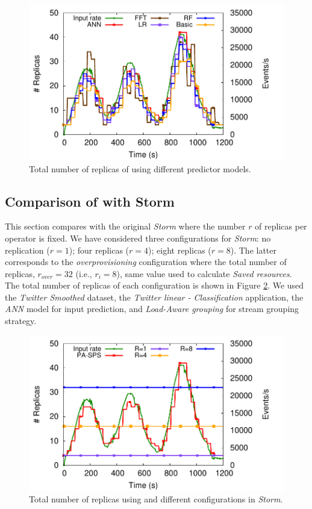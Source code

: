 \begin{figure}[!ht]
    \centering
    \includegraphics[width=0.75\linewidth]{figures/exp/predictive/TwitterLinear-Models-Replicas.pdf}
    \caption{Total number of replicas of \pSPS{} using different predictor models.}
    \label{fig:exp-pa-models-replicas}
\end{figure}


\subsection{Comparison of \pSPS{} with Storm}
\label{exp:pa-storm}
This section compares \pSPS{} with the original \textit{Storm} where the number $r$ of replicas per operator is fixed. We have considered three configurations for \textit{Storm}: no replication ($r=1$); four replicas ($r=4$); eight replicas ($r=8$). The latter corresponds to the \textit{overprovisioning} configuration where the total number of replicas, $r_{over} = 32$ (i.e., $r_i = 8$), same value used to calculate \textit{Saved resources}. The total number of replicas of each configuration is shown in Figure \ref{fig:exp-pa-storm-replicas}. We used the \textit{Twitter Smoothed} dataset, the \textit{Twitter linear - Classification} application, the \textit{ANN} model for input prediction, and \textit{Load-Aware grouping} for stream grouping strategy.

\begin{figure}[!ht]
     \centering
     \includegraphics[width=0.75\linewidth]{figures/exp/predictive/TwitterLinear-Storm-Replicas.pdf}
     \caption{Total number of replicas using \textit{\pSPS{}} and different configurations in \textit {Storm}.}
     \label{fig:exp-pa-storm-replicas}
\end{figure}

